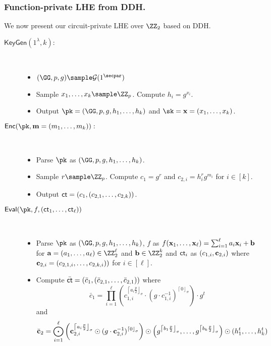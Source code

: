 \subsubsection{Function-private LHE from DDH.} We now present our circuit-private LHE over $\ZZ_2$ based on DDH. 
\begin{description}
\item[$\mathsf{KeyGen}(1^\lambda,k):$]~
\begin{itemize}
\item $(\GG, p, g) \sample \mathcal{G}(1^\secpar)$
    \item Sample $x_1,\dots, x_k\sample \ZZ_p$. Compute $h_i=g^{x_i}$.
    \item Output $\pk=(\GG, p,g,h_1,\dots, h_k)$ and $\sk=\xn=(x_1,\dots, x_k)$.
\end{itemize}

\item[$\mathsf{Enc}(\pk,\mn=(m_1,\dots, m_k)):$]~
\begin{itemize}
    \item Parse $\pk$ as $(\GG, p,g,h_1,\dots, h_k)$.
    \item Sample $r\sample \ZZ_p$. Compute $c_1=g^r$ and $c_{2,i}=h_i^rg^{m_i}$ for $i\in[k]$.%
    \item Output $\mathsf{ct}=(c_1,(c_{2,1},\dots, c_{2,k}))$.
\end{itemize}

\item[$\mathsf{Eval}(\pk,f, (\ct_1,\dots, \ct_\ell))$]~
\begin{itemize}
    \item Parse $\pk$ as $(\GG, p,g,h_1,\dots, h_k)$, $f$ as $f(\mathbf{x}_1,\dots, \mathbf{x}_\ell)=\sum_{i=1}^\ell a_i\mathbf{x}_i + \mathbf{b}$ for $\an=(a_1,\dots, a_\ell)\in\ZZ_2^\ell$ and $\bn\in\ZZ_2^k$ and $\mathsf{ct}_i$ as $(c_{1,i},\mathbf{c}_{2,i})$ where $\mathbf{c}_{2,i}=(c_{2,1,i},\dots, c_{2,k,i}))$ for $i\in [\ell]$.
 
    \item Compute $\bar {\mathsf{ct}}=(\bar c_1, (\bar c_{2,1},\dots ,\bar c_{2,1}))$ where 
    $$\bar c_1=\prod _{i=1}^\ell \left( c_{1,i}^{\left\lceil a_i\frac{p}{2}\right\rfloor_\sigma}\cdot (g\cdot c_{1,i}^{-1})^{\left\lceil 0\right\rfloor_\sigma}  \right) \cdot g^t $$ and 
    $$\bar {\mathbf{c}}_2=\bigodot_{i=1}^\ell \left( \mathbf{c}_{2,i}^{\left\lceil a_i\frac{p}{2}\right\rfloor_\sigma} \odot (g\cdot \mathbf{c}_{2,i}^{-1})^{\left\lceil 0\right\rfloor_\sigma}  \right) \odot \left(g^{\left\lceil b_1\frac{p}{2}\right\rfloor_\sigma},\dots, g^{\left\lceil b_k\frac{p}{2}\right\rfloor_\sigma}\right) \odot (h_1^t,\dots, h_k^t)$$


\end{itemize}
\end{description}
